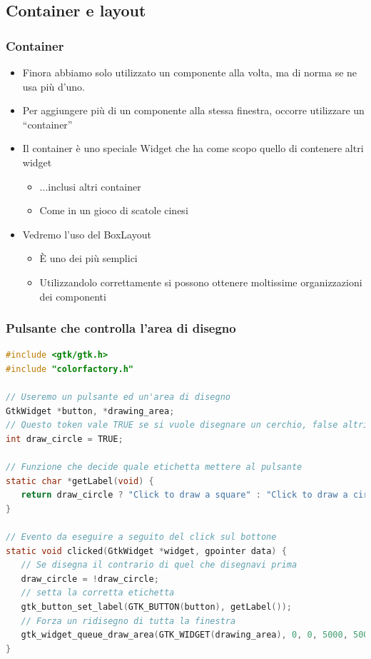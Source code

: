 \documentclass{beamer}
\begin{document}
\subsection{Container e layout}
\begin{frame}
\frametitle{Container}
\begin{itemize}
 \item Finora abbiamo solo utilizzato un componente alla volta, ma di norma se ne usa più d'uno.
 \item Per aggiungere più di un componente alla stessa finestra, occorre utilizzare un ``container''
 \item Il container è uno speciale Widget che ha come scopo quello di contenere altri widget
  \begin{itemize}
   \item ...inclusi altri container
   \item Come in un gioco di scatole cinesi
  \end{itemize}
 \item Vedremo l'uso del BoxLayout
  \begin{itemize}
   \item È uno dei più semplici
   \item Utilizzandolo correttamente si possono ottenere moltissime organizzazioni dei componenti
  \end{itemize}
\end{itemize}
\end{frame}

\begin{frame}[fragile]
\frametitle{Pulsante che controlla l'area di disegno}
\begin{lstlisting}[language=C]
#include <gtk/gtk.h>
#include "colorfactory.h"

// Useremo un pulsante ed un'area di disegno
GtkWidget *button, *drawing_area;
// Questo token vale TRUE se si vuole disegnare un cerchio, false altrimenti
int draw_circle = TRUE;

// Funzione che decide quale etichetta mettere al pulsante
static char *getLabel(void) {
   return draw_circle ? "Click to draw a square" : "Click to draw a circle";
}

// Evento da eseguire a seguito del click sul bottone
static void clicked(GtkWidget *widget, gpointer data) {
   // Se disegna il contrario di quel che disegnavi prima
   draw_circle = !draw_circle;
   // setta la corretta etichetta
   gtk_button_set_label(GTK_BUTTON(button), getLabel());
   // Forza un ridisegno di tutta la finestra
   gtk_widget_queue_draw_area(GTK_WIDGET(drawing_area), 0, 0, 5000, 5000);
}
\end{lstlisting}
\end{frame}
\end{document}
